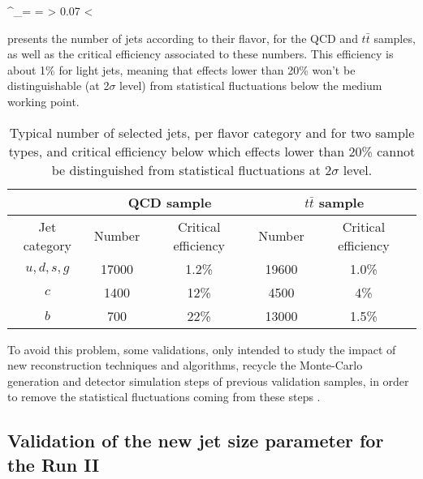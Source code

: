     {
        \sigma^_\epsilon = \frac{\sigma_\epsilon}{\epsilon} =  > 0.07
        \hspace*{1cm}
        \Rightarrow
        \hspace*{1cm}
        \epsilon < 
    }

     presents the number of jets according to their flavor,
    for the QCD and $t\bar{t}$ samples, as well as the critical efficiency associated
    to these numbers. This efficiency is about 1\% for light jets, meaning that effects
    lower than 20\% won't be distinguishable (at 2$\sigma$ level) from statistical
    fluctuations below the medium working point.

    \begin{table}
    \centering
    \begin{tabular}{|c|cc|cc|}
        \hline
                         & \multicolumn{2}{c}{QCD sample} & \multicolumn{2}{c}{$t\bar{t}$ sample} \\
        \hline
           Jet category  & Number & Critical efficiency   & Number & Critical efficiency \\
        \hline
            $u,d,s,g$    & 17000  & 1.2\%                 & 19600  & 1.0\% \\
            $c$          & 1400   & 12\%                  & 4500   & 4\%   \\
            $b$          & 700    & 22\%                  & 13000  & 1.5\% \\
        \hline
    \end{tabular}
        \caption{Typical number of selected jets, per flavor category and for two sample types,
        and critical efficiency below which effects lower than 20\% cannot be distinguished from
        statistical fluctuations at 2$\sigma$ level. \label{tab:criticalEfficiencyBTag}}
    \end{table}

    To avoid this problem, some validations, only intended to study the impact of new
    reconstruction techniques and algorithms, recycle the Monte-Carlo generation and detector simulation
    steps of previous validation samples, in order to remove the statistical fluctuations
    coming from these steps .

    \subsection{Validation of the new jet size parameter for the Run II}

